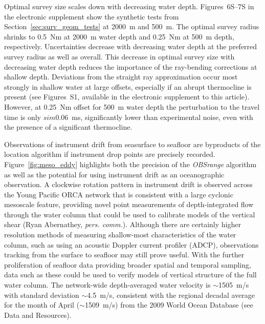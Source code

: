 Optimal survey size scales down with decreasing water depth. Figures~6S--7S in the electronic supplement show the synthetic tests from Section~\ref{sec:surv_geom_tests} at 2000~m and 500~m. The optimal survey radius shrinks to 0.5~Nm at 2000~m water depth and 0.25~Nm at 500~m depth, respectively. Uncertainties decrease with decreasing water depth at the preferred survey radius as well as overall. This decrease in optimal survey size with decreasing water depth reduces the importance of the ray-bending corrections at shallow depth. Deviations from the straight ray approximation occur most strongly in shallow water at large offsets, especially if an abrupt thermocline is present (see Figures~S1, available in the electronic supplement to this article). However, at 0.25~Nm offset for 500~m water depth the perturbation to the travel time is only $sim$0.06~ms, significantly lower than experimental noise, even with the presence of a significant thermocline.

Observations of instrument drift from seasurface to seafloor are byproducts of the location algorithm if instrument drop points are precisely recorded. Figure~\ref{fig:meso_eddy} highlights both the precision of the \textit{OBSrange} algorithm as well as the potential for using instrument drift as an oceanographic observation. A clockwise rotation pattern in instrument drift is observed across the Young Pacific ORCA network that is consistent with a large cyclonic mesoscale feature, providing novel point measurements of depth-integrated flow through the water column that could be used to calibrate models of the vertical shear (Ryan Abernathey, \textit{pers. comm.}). Although there are certainly higher resolution methods of measuring shallow-most characteristics of the water column, such as using an acoustic Doppler current profiler (ADCP), observations tracking from the surface to seafloor may still prove useful. With the further proliferation of seafloor data providing broader spatial and temporal sampling, data such as these could be used to verify models of vertical structure of the full water column. The network-wide depth-averaged water velocity is $\sim$1505~m/s with standard deviation $\sim$4.5~m/s, consistent with the regional decadal average for the month of April ($\sim$1509~m/s) from the 2009 World Ocean Database (see Data and Resources).

